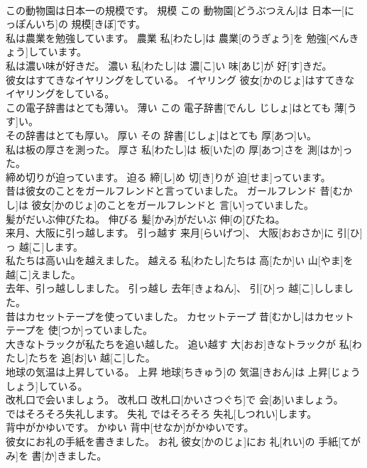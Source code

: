 \documentclass[8pt]{extreport}
\begin{document}
\begin{CJK}{UTF8}{min}
\\	この動物園は日本一の規模です。	規模	この 動物園[どうぶつえん]は 日本一[にっぽんいち]の 規模[きぼ]です。	
\\	私は農業を勉強しています。	農業	私[わたし]は 農業[のうぎょう]を 勉強[べんきょう]しています。	
\\	私は濃い味が好きだ。	濃い	私[わたし]は 濃[こ]い 味[あじ]が 好[す]きだ。	
\\	彼女はすてきなイヤリングをしている。	イヤリング	彼女[かのじょ]はすてきなイヤリングをしている。	
\\	この電子辞書はとても薄い。	薄い	この 電子辞書[でんし じしょ]はとても 薄[うす]い。	
\\	その辞書はとても厚い。	厚い	その 辞書[じしょ]はとても 厚[あつ]い。	
\\	私は板の厚さを測った。	厚さ	私[わたし]は 板[いた]の 厚[あつ]さを 測[はか]った。	
\\	締め切りが迫っています。	迫る	締[し]め 切[き]りが 迫[せま]っています。	
\\	昔は彼女のことをガールフレンドと言っていました。	ガールフレンド	昔[むかし]は 彼女[かのじょ]のことをガールフレンドと 言[い]っていました。	
\\	髪がだいぶ伸びたね。	伸びる	髪[かみ]がだいぶ 伸[の]びたね。	
\\	来月、大阪に引っ越します。	引っ越す	来月[らいげつ]、 大阪[おおさか]に 引[ひ]っ 越[こ]します。	
\\	私たちは高い山を越えました。	越える	私[わたし]たちは 高[たか]い 山[やま]を 越[こ]えました。	
\\	去年、引っ越ししました。	引っ越し	去年[きょねん]、 引[ひ]っ 越[こ]ししました。	
\\	昔はカセットテープを使っていました。	カセットテープ	昔[むかし]はカセットテープを 使[つか]っていました。	
\\	大きなトラックが私たちを追い越した。	追い越す	大[おお]きなトラックが 私[わたし]たちを 追[お]い 越[こ]した。	
\\	地球の気温は上昇している。	上昇	地球[ちきゅう]の 気温[きおん]は 上昇[じょうしょう]している。	
\\	改札口で会いましょう。	改札口	改札口[かいさつぐち]で 会[あ]いましょう。	
\\	ではそろそろ失礼します。	失礼	ではそろそろ 失礼[しつれい]します。	
\\	背中がかゆいです。	かゆい	背中[せなか]がかゆいです。	
\\	彼女にお礼の手紙を書きました。	お礼	彼女[かのじょ]にお 礼[れい]の 手紙[てがみ]を 書[か]きました。	

\end{CJK}
\end{document}
